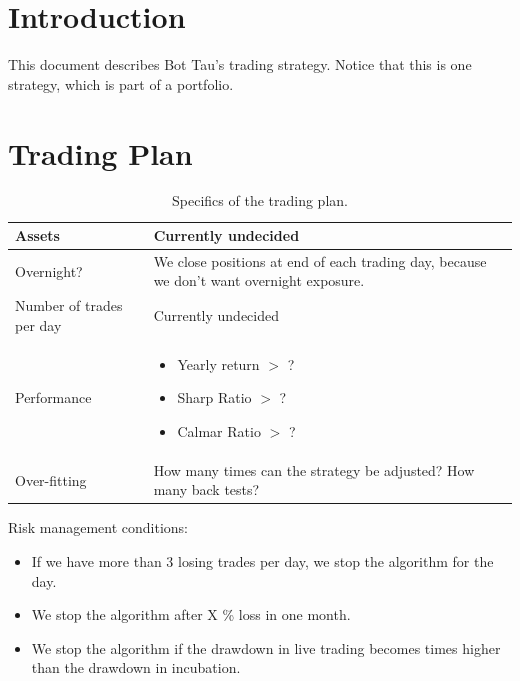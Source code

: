 \documentclass[a4paper]{article}
\title{\documenttitle}
\date{\today}
\author{\name \\
        \href{mailto:fenglich@fastmail.fm}{fenglich@fastmail.fm}}
\begin{document}
\maketitle

\tableofcontents

\listoffigures

\section{Introduction}

This document describes Bot Tau's trading strategy. Notice that this is one strategy, which is part of a portfolio.

\section{Trading Plan}

\begin{table}[H]
\begin{center}
\caption{Specifics of the trading plan.}
    \begin{tabular}{|l|p{4in}|}
        \hline
        Assets              & Currently undecided \\
        \hline
        Overnight?          & We close positions at end of each trading day, because we don't want overnight exposure. \\
        \hline
        Number of trades per day  &  Currently undecided \\
        \hline
        Performance         &   \begin{itemize}
                                    \item Yearly return $>$ ?
                                    \item Sharp Ratio $>$ ?
                                    \item Calmar Ratio $>$  ?
                                \end{itemize} \\
        \hline
        Over-fitting        & How many times can the strategy be adjusted? How many back tests? \\
        \hline
    \end{tabular}
\end{center}
\end{table}

Risk management conditions:

\begin{itemize}
    \item If we have more than 3 losing trades per day, we stop the algorithm
          for the day.
    \item We stop the algorithm after X \% loss in one month.
    \item We stop the algorithm if the drawdown in live trading becomes  times
          higher than the drawdown in incubation.
\end{itemize}
\end{document}
